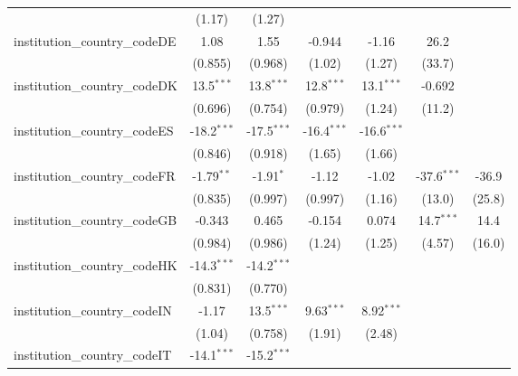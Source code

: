 \begin{tabular}{lcccccc}
                                         & (1.17)        & (1.27)        &               &               &               &   \\   
   institution\_country\_codeDE          & 1.08          & 1.55          & -0.944        & -1.16         & 26.2          &   \\   
                                         & (0.855)       & (0.968)       & (1.02)        & (1.27)        & (33.7)        &   \\   
   institution\_country\_codeDK          & 13.5$^{***}$  & 13.8$^{***}$  & 12.8$^{***}$  & 13.1$^{***}$  & -0.692        &   \\   
                                         & (0.696)       & (0.754)       & (0.979)       & (1.24)        & (11.2)        &   \\   
   institution\_country\_codeES          & -18.2$^{***}$ & -17.5$^{***}$ & -16.4$^{***}$ & -16.6$^{***}$ &               &   \\   
                                         & (0.846)       & (0.918)       & (1.65)        & (1.66)        &               &   \\   
   institution\_country\_codeFR          & -1.79$^{**}$  & -1.91$^{*}$   & -1.12         & -1.02         & -37.6$^{***}$ & -36.9\\   
                                         & (0.835)       & (0.997)       & (0.997)       & (1.16)        & (13.0)        & (25.8)\\   
   institution\_country\_codeGB          & -0.343        & 0.465         & -0.154        & 0.074         & 14.7$^{***}$  & 14.4\\   
                                         & (0.984)       & (0.986)       & (1.24)        & (1.25)        & (4.57)        & (16.0)\\   
   institution\_country\_codeHK          & -14.3$^{***}$ & -14.2$^{***}$ &               &               &               &   \\   
                                         & (0.831)       & (0.770)       &               &               &               &   \\   
   institution\_country\_codeIN          & -1.17         & 13.5$^{***}$  & 9.63$^{***}$  & 8.92$^{***}$  &               &   \\   
                                         & (1.04)        & (0.758)       & (1.91)        & (2.48)        &               &   \\   
   institution\_country\_codeIT          & -14.1$^{***}$ & -15.2$^{***}$ &               &               &               &   \\   

\end{tabular}
